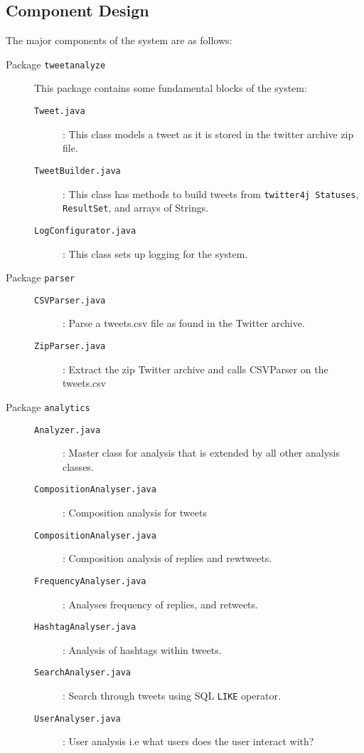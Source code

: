 \documentclass[a4paper, 12pt]{article}
\begin{document}
\subsection{Component Design} \label{sec:component}
\begin{adjustwidth}{1em}{0pt}
The major components of the system are as follows:
\begin{description}
	
	\item[Package \texttt{tweetanalyze}] This package contains some fundamental blocks of the system:
		\begin{description}
		\item[\texttt{Tweet.java}] : This class models a tweet as it is stored in the twitter archive zip file.
		\item[\texttt{TweetBuilder.java}] : This class has methods to build tweets from \texttt{twitter4j Statuses}, \texttt{ResultSet}, and arrays of Strings.
		\item[\texttt{LogConfigurator.java}] : This class sets up logging for the system.
		\end{description}
	
	\item[Package \texttt{parser}]
		\begin{description}
		\item[\texttt{CSVParser.java}] : Parse a tweets.csv file as found in the Twitter archive.
		\item[\texttt{ZipParser.java}] : Extract the zip Twitter archive and calls CSVParser on the tweets.csv
		\end{description}	

	\item[Package \texttt{analytics}]
		\begin{description}
		\item[\texttt{Analyzer.java}] : Master class for analysis that is extended by all other analysis classes.
		\item[\texttt{CompositionAnalyser.java}] : Composition analysis for tweets
		\item[\texttt{CompositionAnalyser.java}] : Composition analysis of replies and rewtweets.
		\item[\texttt{FrequencyAnalyser.java}] : Analyses frequency of replies, and retweets.
		\item[\texttt{HashtagAnalyser.java}] : Analysis of hashtags within tweets.
		\item[\texttt{SearchAnalyser.java}] : Search through tweets using SQL \texttt{LIKE} operator.
		\item[\texttt{UserAnalyser.java}] : User analysis i.e what users does the user interact with?
		\end{description}


\end{description}
\end{adjustwidth}
\end{document}

